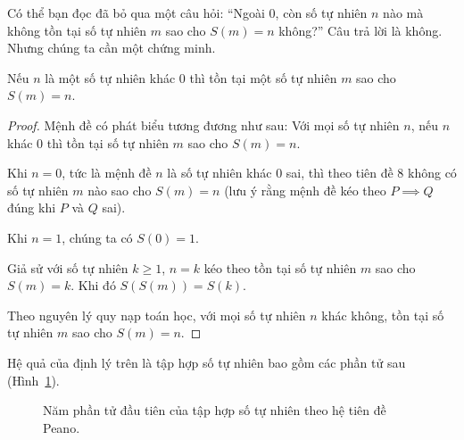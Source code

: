 Có thể bạn đọc đã bỏ qua một câu hỏi: ``Ngoài $0$, còn số tự nhiên $n$ nào mà không tồn tại số tự nhiên $m$ sao cho $S(m) = n$ không?\@'' Câu trả lời là không. Nhưng chúng ta cần một chứng minh.
\begin{theorem}\label{theorem:successor}
	Nếu $n$ là một số tự nhiên khác $0$ thì tồn tại một số tự nhiên $m$ sao cho $S(m) = n$.
\end{theorem}

\begin{proof}
	Mệnh đề có phát biểu tương đương như sau: Với mọi số tự nhiên $n$, nếu $n$ khác $0$ thì tồn tại số tự nhiên $m$ sao cho $S(m) = n$.

	Khi $n = 0$, tức là mệnh đề $n$ là số tự nhiên khác $0$ sai, thì theo tiên đề 8 không có số tự nhiên $m$ nào sao cho $S(m) = n$ (lưu ý rằng mệnh đề kéo theo $P\implies Q$ đúng khi $P$ và $Q$ sai).

	Khi $n = 1$, chúng ta có $S(0) = 1$.

	Giả sử với số tự nhiên $k\geq 1$, $n = k$ kéo theo tồn tại số tự nhiên $m$ sao cho $S(m) = k$. Khi đó $S(S(m)) = S(k)$.

	Theo nguyên lý quy nạp toán học, với mọi số tự nhiên $n$ khác không, tồn tại số tự nhiên $m$ sao cho $S(m) = n$.
\end{proof}

Hệ quả của định lý trên là tập hợp số tự nhiên bao gồm các phần tử sau (Hình~\ref{fig:first-five-natural-numbers}).
\begin{figure}[htp]
	\centering
	\caption{Năm phần tử đầu tiên của tập hợp số tự nhiên theo hệ tiên đề Peano.}\label{fig:first-five-natural-numbers}
\end{figure}

